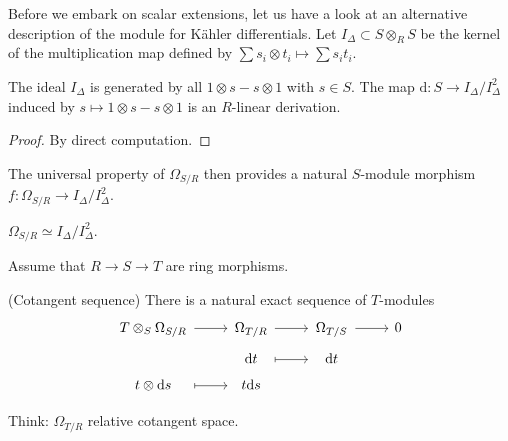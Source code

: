 \documentclass[a4paper,11pt]{article}
\begin{document}
				Before we embark on scalar extensions, let us have a look at an alternative description of the module for K{\"a}hler differentials.
				Let $I_\Delta\subset S\otimes_RS$ be the kernel of the multiplication map defined by $\sum s_i\otimes t_i\mapsto \sum s_it_i$.

				\begin{lemma}
					The ideal $I_\Delta$ is generated by all $1\otimes s-s\otimes 1$ with $s\in S$. The map $\mathrm{d}:S\rightarrow I_{\Delta}/I^2_{\Delta}$ induced by $s\mapsto1\otimes s-s\otimes1$ is an $R$-linear derivation.
				\end{lemma}
				\begin{proof}\renewcommand{\qedsymbol}{}
					By direct computation.
				\end{proof}\renewcommand{\qedsymbol}{$\square$}
				
				The universal property of $\Omega_{S/R}$ then provides a natural $S$-module morphism $f:\Omega_{S/R}\rightarrow I_\Delta/I_\Delta^2$.

				\begin{prop}
					$\Omega_{S/R}\simeq I_\Delta/I_\Delta^2$.
				\end{prop}

				Assume that $R\rightarrow S\rightarrow T$ are ring morphisms.

				\begin{prop}(Cotangent sequence)
					There is a natural exact sequence of $T$-modules
					\begin{equation*}
						\begin{tikzcd}[row sep=tiny,
							/tikz/column 1/.append style={nodes={text width=5em, text centered}},
							/tikz/column 2/.append style={nodes={text width=2.5em, text centered}},
							/tikz/column 3/.append style={nodes={text width=2.5em, text centered}}]
							T\otimes_S\Omega_{S/R}\ar[r] & \Omega_{T/R}\ar[r] & \Omega_{T/S}\ar[r] & 0\\
							& \mathrm{d}t\ar[r,mapsto] & \mathrm{d}t &\\
							t\otimes \mathrm{d}s\ar[r,mapsto] & t\mathrm{d}s & &
						\end{tikzcd}
					\end{equation*}
				\end{prop}

				\noindent Think: $\Omega_{T/R}$ relative cotangent space.
\end{document}
